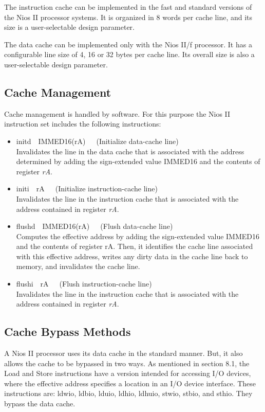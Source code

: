 \documentclass[11pt, twoside, pdftex]{article}
\begin{document}
The instruction cache can be implemented in the fast and standard versions of
the Nios II processor systems. It is organized in 8 words per cache line, and its size
is a user-selectable design parameter.
  

The data cache can be implemented only with the Nios II/f processor. It has a
configurable line size of 4, 16 or 32 bytes per cache line. Its overall size is also a
user-selectable design parameter.

\subsection{Cache Management}

Cache management is handled by software. For this purpose
the Nios II instruction set includes the following instructions:
\begin{itemize}
\item {\sf initd~~IMMED16(rA)}~~~(Initialize data-cache line) \\
Invalidates the line in the data cache that is associated with the address determined
by adding the sign-extended value IMMED16 and the contents of register {\it rA}.
\item {\sf initi~~rA}~~~(Initialize instruction-cache line) \\
Invalidates the line in the instruction cache that is associated with the address
contained in register {\it rA}.
\item {\sf flushd~~IMMED16(rA)}~~~(Flush data-cache line) \\
Computes the effective address by adding the sign-extended value IMMED16 and the
contents of register rA. Then, it identifies the cache line associated with this
effective address, writes any dirty data in the cache line back to memory, and
invalidates the cache line.
\item {\sf flushi~~rA}~~~(Flush instruction-cache line) \\
Invalidates the line in the instruction cache that is associated with the address
contained in register {\it rA}.
\end{itemize}

\subsection{Cache Bypass Methods}

A Nios II processor uses its data cache in the standard manner. But, it also allows the
cache to be bypassed in two ways. As mentioned in section 8.1, the Load and Store
instructions have a version intended for accessing I/O devices, where the
effective address specifies a location in an I/O device interface. These instructions are:
{\sf ldwio}, {\sf ldbio}, {\sf lduio}, {\sf ldhio}, {\sf ldhuio}, {\sf stwio}, {\sf stbio},
and {\sf sthio}. They bypass the data cache.
\end{document}

